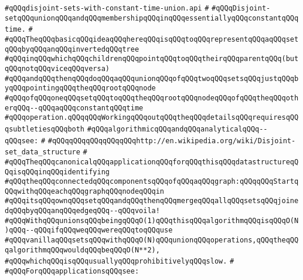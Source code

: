 \label{src/lib/src/disjoint-sets-with-constant-time-union.api}
\verb|#qQQqdisjoint-sets-with-constant-time-union.api|\newline
\verb|#|\newline
\verb|#qQQqDisjoint-setqQQqunionqQQqandqQQqmembershipqQQqinqQQqessentiallyqQQqconstantqQQqtime.|\newline
\verb|#|\newline
\verb|#qQQqTheqQQqbasicqQQqideaqQQqhereqQQqisqQQqtoqQQqrepresentqQQqaqQQqsetqQQqbyqQQqanqQQqinvertedqQQqtree|\newline
\verb|#qQQqinqQQqwhichqQQqchildrenqQQqpointqQQqtoqQQqtheirqQQqparentqQQq(butqQQqnotqQQqviceqQQqversa)|\newline
\verb|#qQQqandqQQqthenqQQqdoqQQqaqQQqunionqQQqofqQQqtwoqQQqsetsqQQqjustqQQqbyqQQqpointingqQQqtheqQQqrootqQQqnode|\newline
\verb|#qQQqofqQQqoneqQQqsetqQQqtoqQQqtheqQQqrootqQQqnodeqQQqofqQQqtheqQQqotherqQQq--qQQqaqQQqconstantqQQqtime|\newline
\verb|#qQQqoperation.qQQqqQQqWorkingqQQqoutqQQqtheqQQqdetailsqQQqrequiresqQQqsubtletiesqQQqboth|\newline
\verb|#qQQqalgorithmicqQQqandqQQqanalyticalqQQq--qQQqsee:|\newline
\verb|#|\newline
\verb|#qQQqqQQqqQQqqQQqqQQqhttp://en.wikipedia.org/wiki/Disjoint-set_data_structure|\newline
\verb|#|\newline
\verb|#qQQqTheqQQqcanonicalqQQqapplicationqQQqforqQQqthisqQQqdatastructureqQQqisqQQqinqQQqidentifying|\newline
\verb|#qQQqtheqQQqconnectedqQQqcomponentsqQQqofqQQqaqQQqgraph:qQQqqQQqStartqQQqwithqQQqeachqQQqgraphqQQqnodeqQQqin|\newline
\verb|#qQQqitsqQQqownqQQqsetqQQqandqQQqthenqQQqmergeqQQqallqQQqsetsqQQqjoinedqQQqbyqQQqanqQQqedgeqQQq--qQQqvoila!|\newline
\verb|#qQQqWithqQQqunionsqQQqbeingqQQqO(1)qQQqthisqQQqalgorithmqQQqisqQQqO(N)qQQq--qQQqifqQQqweqQQqwereqQQqtoqQQquse|\newline
\verb|#qQQqvanillaqQQqsetsqQQqwithqQQqO(N)qQQqunionqQQqoperations,qQQqtheqQQqalgorithmqQQqwouldqQQqbeqQQqO(N**2),|\newline
\verb|#qQQqwhichqQQqisqQQqusuallyqQQqprohibitivelyqQQqslow.|\newline
\verb|#|\newline
\verb|#qQQqForqQQqapplicationsqQQqsee:|\newline
